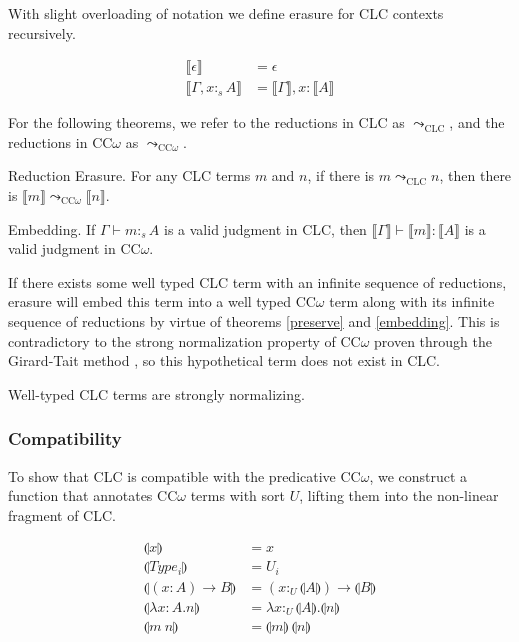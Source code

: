 \documentclass[sigplan,screen,review,anonymous]{acmart}
\newcommand{\utype}{:_{\scriptscriptstyle U}}
\newcommand{\stype}[1]{:_#1}
\newcommand{\step}{\leadsto}
\newcommand{\erase}[1]{\llbracket #1 \rrbracket}
\newcommand{\lift}[1]{\llparenthesis #1 \rrparenthesis}
\begin{document}
With slight overloading of notation we define erasure for CLC contexts recursively.

\begin{definition}
  \begin{align*}
    \erase{\epsilon}              & = \epsilon                      \\
    \erase{\Gamma, x \stype{s} A} & = \erase{\Gamma}, x : \erase{A}
  \end{align*}
\end{definition}

For the following theorems, we refer to the reductions in CLC as $\step_{\scriptscriptstyle \text{CLC}}$, and the reductions in CC$\omega$ as $\step_{\scriptscriptstyle \text{CC$\omega$}}$.

\begin{theorem} \label{preserve}
  Reduction Erasure. For any CLC terms $m$ and $n$, if there is $m \step_{\scriptscriptstyle \text{CLC}} n$, then there is $\erase{m} \step_{\scriptscriptstyle \text{CC$\omega$}} \erase{n}$.
\end{theorem}

\begin{theorem} \label{embedding}
  Embedding. If $\Gamma \vdash m \stype{s} A$ is a valid judgment in CLC, then $\erase{\Gamma} \vdash \erase{m} : \erase{A}$ is a valid judgment in CC$\omega$.
\end{theorem}

If there exists some well typed CLC term with an infinite sequence of reductions, erasure will embed this term into a well typed CC$\omega$ term along with its infinite sequence of reductions by virtue of theorems \ref{preserve} and \ref{embedding}. This is contradictory to the strong normalization property of CC$\omega$ proven through the Girard-Tait method \cite{ecc}, so this hypothetical term does not exist in CLC.

\begin{theorem}
  Well-typed CLC terms are strongly normalizing.
\end{theorem}

\subsubsection{Compatibility}
To show that CLC is compatible with the predicative CC$\omega$, we construct a function that annotates CC$\omega$ terms with sort $U$, lifting them into the non-linear fragment of CLC.

\begin{definition}
  \begin{align*}
    \lift{x}                     & = x                                        \\
    \lift{Type_i}                & = U_i                                      \\
    \lift{(x : A) \rightarrow B} & = (x \utype \lift{A}) \rightarrow \lift{B} \\
    \lift{\lambda x : A.n}       & = \lambda x\utype\lift{A}.\lift{n}         \\
    \lift{m\ n}                  & = \lift{m}\ \lift{n}
  \end{align*}
\end{definition}
\end{document}

